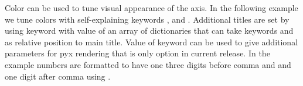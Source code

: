 \documentclass[a4paper,11pt,english]{sphinxmanual}
\begin{document}
Color can be used to tune visual appearance of the axis. In the following example we tune colors with self-explaining
keywords ,  and . Additional titles are set by using keyword 
with value of an array of dictionaries that can take keywords  and  as relative position to main title.
Value of keyword  can be used to give additional parameters for pyx rendering
that is only option in current release. In the example numbers are formatted to have one three digits before comma and
and one digit after comma using .
\end{document}
